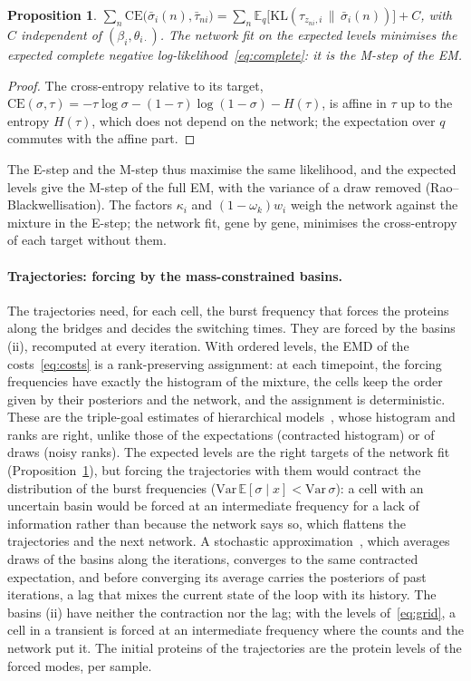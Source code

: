 \documentclass[a4paper, 11pt]{article}
\newcommand{\E}{\mathbb{E}}
\newcommand{\CE}{\mathrm{CE}}
\theoremstyle{plain}
\newtheorem{prop}{Proposition}
\theoremstyle{remark}
\begin{document}
\begin{prop}\label{prop:mstep}
$\sum_n \CE\bigl(\bar\sigma_i(n), \bar\tau_{ni}\bigr) = \sum_n \E_{q}\bigl[\mathrm{KL}(\tau_{z_{ni},i} \,\|\, \bar\sigma_i(n))\bigr] + C$, with $C$ independent of $(\beta_i, \theta_{i\cdot})$. The network fit on the expected levels minimises the expected complete negative log-likelihood~\eqref{eq:complete}: it is the M-step of the EM.
\end{prop}

\begin{proof}
The cross-entropy relative to its target, $\CE(\sigma, \tau) = -\tau\log\sigma - (1-\tau)\log(1-\sigma) - H(\tau)$, is affine in $\tau$ up to the entropy $H(\tau)$, which does not depend on the network; the expectation over $q$ commutes with the affine part.
\end{proof}

The E-step and the M-step thus maximise the same likelihood, and the expected levels give the M-step of the full EM, with the variance of a draw removed (Rao--Blackwellisation). The factors $\kappa_i$ and $(1 - \omega_k)w_i$ weigh the network against the mixture in the E-step; the network fit, gene by gene, minimises the cross-entropy of each target without them.

\paragraph{Trajectories: forcing by the mass-constrained basins.} The trajectories need, for each cell, the burst frequency that forces the proteins along the bridges and decides the switching times. They are forced by the basins (ii), recomputed at every iteration. With ordered levels, the EMD of the costs~\eqref{eq:costs} is a rank-preserving assignment: at each timepoint, the forcing frequencies have exactly the histogram of the mixture, the cells keep the order given by their posteriors and the network, and the assignment is deterministic. These are the triple-goal estimates of hierarchical models~\cite{shen1998triple}, whose histogram and ranks are right, unlike those of the expectations (contracted histogram) or of draws (noisy ranks). The expected levels are the right targets of the network fit (Proposition~\ref{prop:mstep}), but forcing the trajectories with them would contract the distribution of the burst frequencies ($\mathrm{Var}\,\E[\sigma\mid x] < \mathrm{Var}\,\sigma$): a cell with an uncertain basin would be forced at an intermediate frequency for a lack of information rather than because the network says so, which flattens the trajectories and the next network. A stochastic approximation~\cite{delyon1999saem}, which averages draws of the basins along the iterations, converges to the same contracted expectation, and before converging its average carries the posteriors of past iterations, a lag that mixes the current state of the loop with its history. The basins (ii) have neither the contraction nor the lag; with the levels of~\eqref{eq:grid}, a cell in a transient is forced at an intermediate frequency where the counts and the network put it. The initial proteins of the trajectories are the protein levels of the forced modes, per sample.
\end{document}
